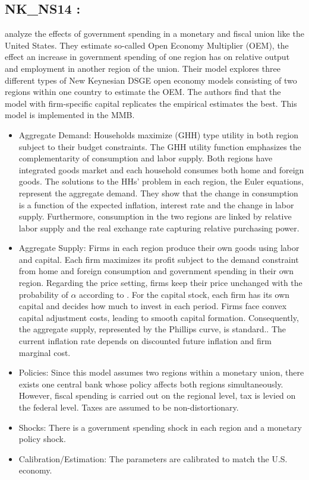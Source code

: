 \documentclass[11pt,a4paper]{article}
\begin{document}
	
	
	\subsection{NK\_NS14 : \texorpdfstring{\cite{NakamuraSteinsson2014}}{Nakamura and Steinsson (2014)}} 
	\label{NKNS14}   
	\cite{NakamuraSteinsson2014}  analyze the effects of government spending in a monetary and fiscal union like the United States. They estimate so-called Open Economy Multiplier (OEM), the effect an increase in government spending of one region has on relative output and employment in another region of the union.  Their model explores three different types of New Keynesian DSGE open economy models consisting of two regions within one country to estimate the OEM. The authors find that the model with firm-specific capital replicates the empirical estimates the best. This model is implemented in the MMB. 
	\begin{itemize}
		\item Aggregate Demand: Households maximize \cite{greenwood1988investment} (GHH) type utility in both region subject to their budget constraints. The GHH utility function emphasizes the complementarity of consumption and labor supply. Both regions have integrated goods market and each household consumes both home and foreign goods. 
		The solutions to the HHs' problem in each region, the Euler equations, represent the aggregate demand. They show that the change in	consumption is a function of the expected inflation, interest rate and the change in labor supply. 
		Furthermore, consumption in the two regions are linked by relative labor supply and the real exchange rate capturing relative purchasing power.
		\item Aggregate Supply: Firms in each region produce their own goods using labor and capital. Each firm maximizes its profit subject to the demand constraint from home and foreign consumption and government spending in their own region. Regarding the price setting, firms keep their price unchanged with the probability of $\alpha$ according to \cite{Calvo1983}. For the capital stock, each firm has its own capital and decides how much to invest in each period. Firms face convex capital adjustment costs, leading to smooth capital formation. Consequently, the aggregate supply, represented by the Phillips curve, is standard.. The current inflation rate depends on discounted future inflation and firm marginal cost.
		\item Policies: Since this model assumes two regions within a monetary union, there exists one central bank whose policy affects both regions simultaneously. However, fiscal spending is carried out on the regional level, tax is levied on the federal level. Taxes are assumed to be non-distortionary.
		\item Shocks: There is a government spending shock in each region and a monetary policy shock.
		\item Calibration/Estimation: The parameters are calibrated to match the U.S. economy.
	\end{itemize}
	
\end{document}
